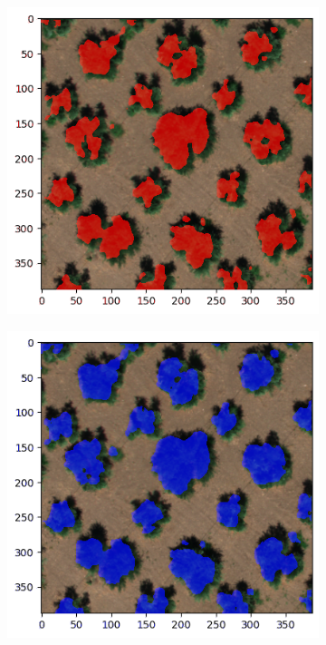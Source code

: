 \documentclass[comsoc,final]{IEEEtran}
\begin{document}
\begin{figure}
{\begin{subfigure}[b]{0.3\columnwidth}
         \includegraphics[width=\columnwidth]{ULIVO1INF}
         \caption{}
     \end{subfigure}}%
%       
     \begin{subfigure}[b]{0.3\columnwidth}
         \centering
         \includegraphics[width=\columnwidth]{ULIVO2INF}
         \caption{}
     \end{subfigure}%
% 


\end{figure}
\end{document}
